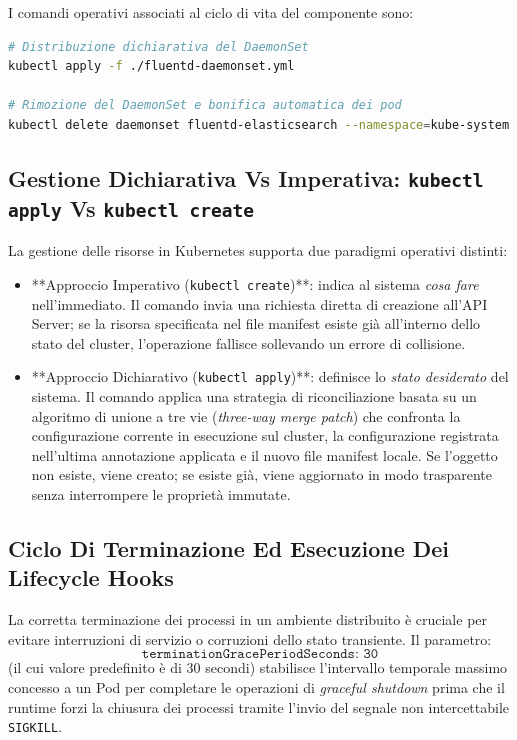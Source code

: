 \documentclass[11pt, a4paper]{article}
\begin{document}
I comandi operativi associati al ciclo di vita del componente sono:
\begin{lstlisting}[language=bash]
# Distribuzione dichiarativa del DaemonSet
kubectl apply -f ./fluentd-daemonset.yml

# Rimozione del DaemonSet e bonifica automatica dei pod
kubectl delete daemonset fluentd-elasticsearch --namespace=kube-system
\end{lstlisting}

\subsection{Gestione Dichiarativa Vs Imperativa: \texttt{kubectl apply} Vs \texttt{kubectl create}}

La gestione delle risorse in Kubernetes supporta due paradigmi operativi distinti:
\begin{itemize}[noitemsep]
    \item **Approccio Imperativo (\texttt{kubectl create})**: indica al sistema \emph{cosa fare} nell'immediato. Il comando invia una richiesta diretta di creazione all'API Server; se la risorsa specificata nel file manifest esiste già all'interno dello stato del cluster, l'operazione fallisce sollevando un errore di collisione.
    \item **Approccio Dichiarativo (\texttt{kubectl apply})**: definisce lo \emph{stato desiderato} del sistema. Il comando applica una strategia di riconciliazione basata su un algoritmo di unione a tre vie (\emph{three-way merge patch}) che confronta la configurazione corrente in esecuzione sul cluster, la configurazione registrata nell'ultima annotazione applicata e il nuovo file manifest locale. Se l'oggetto non esiste, viene creato; se esiste già, viene aggiornato in modo trasparente senza interrompere le proprietà immutate.
\end{itemize}

\subsection{Ciclo Di Terminazione Ed Esecuzione Dei Lifecycle Hooks}

La corretta terminazione dei processi in un ambiente distribuito è cruciale per evitare interruzioni di servizio o corruzioni dello stato transiente. Il parametro:
\[
\texttt{terminationGracePeriodSeconds: 30}
\]
(il cui valore predefinito è di 30 secondi) stabilisce l'intervallo temporale massimo concesso a un Pod per completare le operazioni di \emph{graceful shutdown} prima che il runtime forzi la chiusura dei processi tramite l'invio del segnale non intercettabile \texttt{SIGKILL}.
\end{document}
